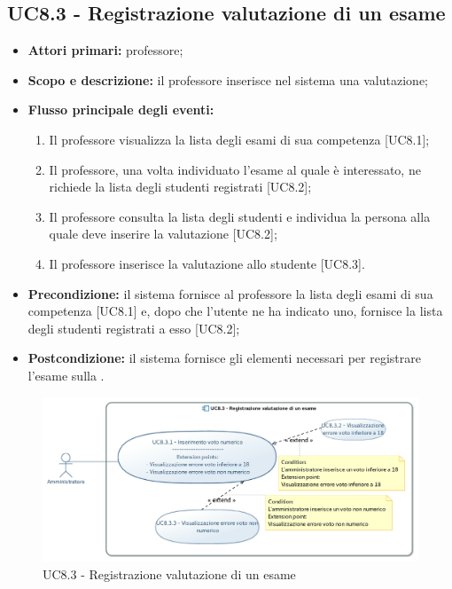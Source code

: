 \documentclass[AnalisiDeiRequisiti.tex]{subfiles}
\begin{document}
\subsection{UC8.3 - Registrazione valutazione di un esame}
\begin{itemize}
	\item \textbf{Attori primari:} professore;
	\item \textbf{Scopo e descrizione:} il professore inserisce nel sistema una valutazione;
	\item \textbf{Flusso principale degli eventi:}
	\begin{enumerate}
		\item Il professore visualizza la lista degli esami di sua competenza [UC8.1];
		\item Il professore, una volta individuato l'esame al quale è interessato, ne richiede la lista degli studenti registrati [UC8.2];
		\item Il professore consulta la lista degli studenti e individua la persona alla quale deve inserire la valutazione [UC8.2];
		\item Il professore inserisce la valutazione allo studente [UC8.3].
	\end{enumerate}
	\item \textbf{Precondizione:} il sistema fornisce al professore la lista degli esami di sua competenza [UC8.1] e, dopo che l'utente ne ha indicato uno, fornisce la lista degli studenti registrati a esso [UC8.2];
	\item \textbf{Postcondizione:} il sistema fornisce gli elementi necessari per registrare l'esame sulla .
\end{itemize}
\begin{figure}[H]
	\centering
	\includegraphics[width=0.7\linewidth]{UC8_3.jpg}
	\caption{UC8.3 - Registrazione valutazione di un esame}
	\label{UC8.3 - Registrazione valutazione di un esame}
\end{figure}
\end{document}
